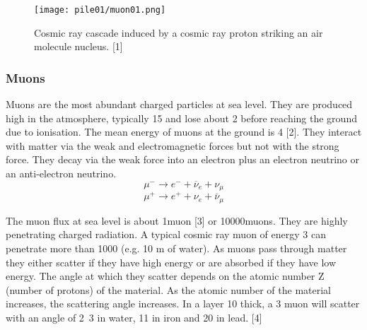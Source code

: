 \documentclass[twocolumn,a4paper]{article}
\begin{document}
\begin{figure}
  \texttt{[image: pile01/muon01.png]}
  \caption{Cosmic ray cascade induced by a cosmic ray proton striking
    an air molecule nucleus. [1]}
\end{figure}

\subsubsection{Muons}
Muons are the most abundant charged particles at sea level. They are
produced high in the atmosphere, typically \unit{15}{\kilo\metre} and
lose about \unit{2}{\giga\electronvolt} before reaching the ground due
to ionisation. The mean energy of muons at the ground is
\unit{4}{\giga\electronvolt} [2]. They interact with matter via the
weak and electromagnetic forces but not with the strong force. They
decay via the weak force into an electron plus an electron neutrino or
an anti-electron neutrino.
\begin{equation} \mu^- \rightarrow e^- + \overline{\nu}_e + \nu_\mu \end{equation}
\begin{equation} \mu^+ \rightarrow e^+ + \nu_e + \overline{\nu}_\mu \end{equation}

The muon flux at sea level is about
\unit{1}{muon\usk\rpsquare{\centi\metre}\usk\reciprocal\minute} [3] or
\unit{10000}{muons\usk\rpsquare\metre\usk\reciprocal\minute}. They are
highly penetrating charged radiation.  A typical cosmic ray muon of
energy \unit{3}{\giga\electronvolt} can penetrate more than
\unit{1000}{\gram\usk\rpsquare{\centi\metre}} (e.g. 10 m of water). As
muons pass through matter they either scatter if they have high energy
or are absorbed if they have low energy. The angle at which they
scatter depends on the atomic number Z (number of protons) of the
material. As the atomic number of the material increases, the
scattering angle increases. In a layer \unit{10}{\centi\metre} thick,
a \unit{3}{\giga\electronvolt} muon will scatter with an angle of
\unit{2.3}{\milli\radian} in water, \unit{11}{\milli\radian} in iron
and \unit{20}{\milli\radian} in lead. [4]
\end{document}
